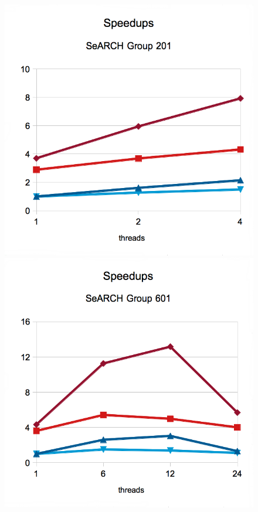 \documentclass[abstract=on,9pt,twocolumn]{scrartcl}
\begin{document}
\begin{figure}[!p]
	\begin{center}
		\includegraphics[width=\columnwidth]{images/report.april/speedup201.png}
		\includegraphics[width=\columnwidth]{images/report.april/speedup601.png}

\end{center}
\end{figure}
\end{document}
